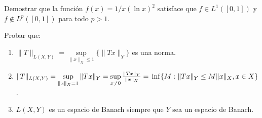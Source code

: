 \documentclass{book}
\begin{document}

 \begin{ejer}{}
  Demostrar que la función $f(x)=1 /x(\ln x)^2 $ satisface que $f\in L^1([0,1])$ y $f\notin L^p([0,1])$ para todo $p>1$.
  \end{ejer}
\begin{ejer}{} Probar que: 
		\begin{enumerate}
	\item 
$\|T\|_{L(X,Y)}=\sup\limits_{\|x\|_{X}\leq 1}\{\|Tx\|_{Y}\}$
es una norma.
	\item 
 $\|T\|_{L(X,Y)}=\sup\limits_{\|x\|_{X}=1}\|Tx\|_{Y}=
\sup\limits_{x \not =0}\frac{\|Tx\|_{Y}}{\|x\|_{X}}=
\\
\inf\{M:\|Tx\|_{Y}\leq M \|x\|_{X}, x\in X\}$.
\item $L(X,Y)$ es un espacio de Banach siempre que $Y$ sea un espacio de Banach.
		\end{enumerate}
\end{ejer}
		

\end{document}
